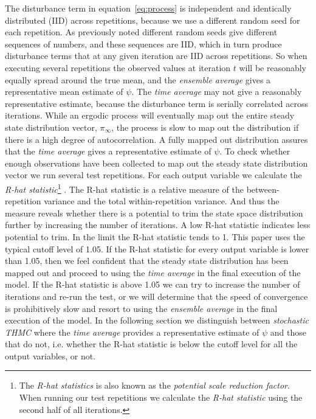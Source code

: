 \documentclass[preprint, 12pt]{elsarticle}
\begin{document}
The disturbance term in equation~\ref{eq:process} is independent and identically distributed (IID) across repetitions, because we use a different random seed for each repetition. As previously noted different random seeds give different sequences of numbers, and these sequences are IID, which in turn produce disturbance terms that at any given iteration are IID across repetitions. So when executing several repetitions the observed values at iteration $t$ will be reasonably equally spread around the true mean, and the \emph{ensemble average} gives a representative mean estimate of $\psi$. The \emph{time average} may not give a reasonably representative estimate, because the disturbance term is serially correlated across iterations. While an ergodic process will eventually map out the entire steady state distribution vector, $\pi_\infty$, the process is slow to map out the distribution if there is a high degree of autocorrelation. A fully mapped out distribution assures that the \emph{time average} gives a representative estimate of $\psi$. To check whether enough observations have been collected to map out the steady state distribution vector we run several test repetitions. For each output variable we calculate the \emph{R-hat statistic}\footnote{The \emph{R-hat statistics} is also known as the \emph{potential scale reduction factor}. When running our test repetitions we calculate the \emph{R-hat statistic} using the second half of all iterations.} \citep{Laver_Sergenti_2011, Brooks_Gelman_1998}. The R-hat statistic is a relative measure of the between-repetition variance and the total within-repetition variance. And thus the measure reveals whether there is a potential to trim the state space distribution further by increasing the number of iterations. A low R-hat statistic indicates less potential to trim. In the limit the R-hat statistic tends to 1. This paper uses the typical cutoff level of 1.05. If the R-hat statistic for every output variable is lower than 1.05, then we feel confident that the steady state distribution has been mapped out and proceed to using the \emph{time average} in the final execution of the model. If the R-hat statistic is above 1.05 we can try to increase the number of iterations and re-run the test, or we will determine that the speed of convergence is prohibitively slow and resort to using the \emph{ensemble average} in the final execution of the model. In the following section we distinguish between \emph{stochastic THMC} where the \emph{time average} provides a representative estimate of $\psi$ and those that do not, i.e. whether the R-hat statistic is below the cutoff level for all the output variables, or not. 
\end{document}

